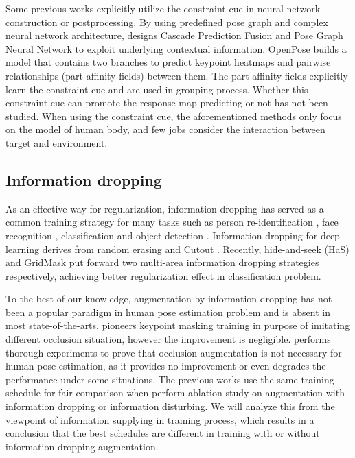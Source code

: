 \documentclass[final]{cvpr}
\begin{document}
Some previous works explicitly utilize the constraint cue in neural network construction or postprocessing. By using predefined pose graph and complex neural network architecture, \cite{SCI} designs Cascade Prediction Fusion and Pose Graph Neural Network to exploit underlying contextual information. OpenPose \cite{OpenPose} builds a model that contains two branches to predict keypoint heatmaps and pairwise relationships (part affinity fields) between them. The part affinity fields explicitly learn the constraint cue and are used in grouping process. Whether this constraint cue can promote the response map predicting or not has not been studied. When using the constraint cue, the aforementioned methods only focus on the model of human body, and few jobs consider the interaction between target and environment.


\subsection{Information dropping}
As an effective way for regularization, information dropping has served as a common training strategy for many tasks such as person re-identification \cite{BTforREID}, face recognition \cite{IDforFR}, classification \cite{SENet} and object detection \cite{IDforDET}. Information dropping for deep learning derives from random erasing \cite{REDA} and Cutout \cite{Cutout}. Recently, hide-and-seek (HaS) \cite{HaS} and GridMask \cite{GridMask} put forward two multi-area information dropping strategies respectively, achieving better regularization effect in classification problem.

To the best of our knowledge, augmentation by information dropping has not been a popular paradigm in human pose estimation problem and is absent in most state-of-the-arts. \cite{MSSAN} pioneers keypoint masking training in purpose of imitating different occlusion situation, however the improvement is negligible. \cite{TAW} performs thorough experiments to prove that occlusion augmentation is not necessary for human pose estimation, as it provides no improvement or even degrades the performance under some situations. The previous works use the same training schedule for fair comparison when perform ablation study on augmentation with information dropping or information disturbing. We will analyze this from the viewpoint of information supplying in training process, which results in a conclusion that the best schedules are different in training with or without information dropping augmentation.
\end{document}
